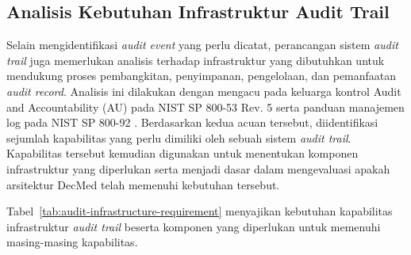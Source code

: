 \subsection{Analisis Kebutuhan Infrastruktur Audit Trail}

Selain mengidentifikasi \textit{audit event} yang perlu dicatat, perancangan sistem \textit{audit trail} juga memerlukan analisis terhadap infrastruktur yang dibutuhkan untuk mendukung proses pembangkitan, penyimpanan, pengelolaan, dan pemanfaatan \textit{audit record}. Analisis ini dilakukan dengan mengacu pada keluarga kontrol Audit and Accountability (AU) pada NIST SP 800-53 Rev. 5 \cite{nist80053r5} serta panduan manajemen log pada NIST SP 800-92 \cite{nist80092}. Berdasarkan kedua acuan tersebut, diidentifikasi sejumlah kapabilitas yang perlu dimiliki oleh sebuah sistem \textit{audit trail}. Kapabilitas tersebut kemudian digunakan untuk menentukan komponen infrastruktur yang diperlukan serta menjadi dasar dalam mengevaluasi apakah arsitektur DecMed telah memenuhi kebutuhan tersebut.

Tabel~\ref{tab:audit-infrastructure-requirement} menyajikan kebutuhan kapabilitas infrastruktur \textit{audit trail} beserta komponen yang diperlukan untuk memenuhi masing-masing kapabilitas.

